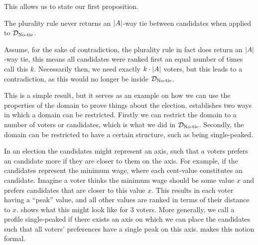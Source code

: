 This allows us to state our first proposition.

\begin{proposition}
	The plurality rule never returns an $|A|$-way tie between candidates when applied to $\mathcal{D}_{\textnormal{No-tie}}$.
\end{proposition}

\begin{proofc}
	Assume, for the sake of contradiction, the plurality rule in fact does
	return an $|A|$-way tie, this means all candidates were ranked first an
	equal number of times call this $k$. Necessarily then, we need
	exactly $k \cdot |A|$ voters, but this leads to a
	contradiction, as this would no longer be inside $\mathcal{D}_{\textnormal{No-tie}}$.
\end{proofc}

This is a simple result, but it serves as an example on how we can use the
properties of the domain to prove things about the election.
\citet{gaertnerDomainRestrictions2002} establishes two ways in which a domain can
be restricted. Firstly we can restrict the domain to a number of voters or
candidates, which is what we did in $\mathcal{D}_{\textnormal{No-tie}}$. Secondly, the domain can
be restricted to have a certain structure, such as being single-peaked.


In an election the candidates might represent an axis, such that a voters
prefers an candidate more if they are closer to them on the axis. For
example, if the candidates represent the minimum wage, where each cent-value
constitutes an candidate. Imagine a voter thinks the minimum wage should  be
some value $x$ and prefers candidates that are closer to this value $x$. This
results in each voter having a ``peak'' value, and all other values are ranked
in terms of their distance to $x$.  shows what this
might look like for 3 voters. More generally, we call a profile single-peaked
if there exists an axis on which we can place the candidates such that all
voters' preferences have a single peak on this axis. 
makes this notion formal.

